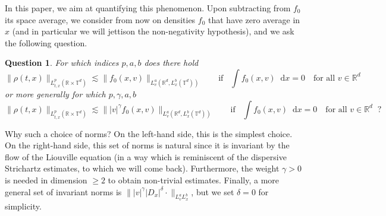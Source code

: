 \documentclass[11pt,a4paper,reqno]{amsart}
\theoremstyle{plain}
\newtheorem{question}{Question}
\theoremstyle{remark}
\newcommand{\dd}{\mathop{}\!\mathrm{d}}
\begin{document}
In this paper, we aim at quantifying this phenomenon. Upon subtracting from $f_0$ its space average, we consider from now on densities $f_0$ that have zero average in $x$ (and in particular we will jettison the non-negativity hypothesis), and we ask the following question.

\begin{question}\label{question1}
For which indices $p,a,b$ does there hold
\begin{equation}
\label{withoutweight}
    \| \rho(t,x) \|_{{L^p_{t,x}}(\mathbb{R} \times \mathbb{T}^d)} \lesssim \|  f_0(x,v) \|_{L^a_v(\mathbb{R}^d,L^b_x(\mathbb{T}^d))} \qquad \mbox{if} \;\;\; \int f_0(x,v) \dd x = 0 \quad \mbox{for all $v \in \mathbb{R}^d$}
\end{equation}
or more generally for which $p,\gamma,a,b$
\begin{equation}
\label{withweight}
    \| \rho(t,x) \|_{{L^p_{t,x}}(\mathbb{R} \times \mathbb{T}^d)} \lesssim \|  |v|^\gamma f_0(x,v) \|_{L^a_v(\mathbb{R}^d,L^b_x(\mathbb{T}^d))} \qquad \mbox{if} \;\;\; \int f_0(x,v) \dd x = 0 \quad \mbox{for all $v \in \mathbb{R}^d$} \;\; ?
\end{equation}
\end{question}

Why such a choice of norms? On the left-hand side, this is the simplest choice. On the right-hand side, this set of norms is natural since it is invariant by the flow of the Liouville equation (in a way which is reminiscent of the dispersive Strichartz estimates, to which we will come back). Furthermore, the weight $\gamma>0$ is needed in dimension $\geq 2$ to obtain non-trivial estimates. Finally, a more general set of invariant norms is $\||v|^{\gamma}|D_x|^{\delta} \cdot \|_{L^a_vL^b_x}$, but we set $\delta=0$ for simplicity.
\end{document}
